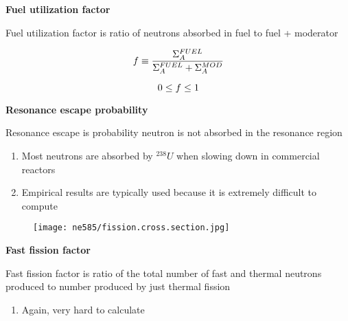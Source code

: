 \documentclass[aspectratio=1610,pdftex,dvipsnames,compress,xcolor={dvipsnames}]{beamer}
\begin{document}
\begin{frame}[plain]{}
    \centering\LARGE\textbf{Fuel utilization factor}
\end{frame}


\addtocounter{framenumber}{-1} 
\begin{frame}{Fuel utilization factor is ratio of neutrons absorbed in fuel to fuel + moderator}

    \begin{equation}
        \LARGE
        f \equiv \frac{\Sigma^{FUEL}_A}{\Sigma^{FUEL}_A + \Sigma^{MOD}_A}
    \end{equation}

    \begin{equation}
        \LARGE
        0 \leq f \leq 1
    \end{equation}

\end{frame}


\begin{frame}[plain]{}
    \centering\LARGE\textbf{Resonance escape probability}
\end{frame}


\addtocounter{framenumber}{-1} 
\begin{frame}{Resonance escape is probability neutron is not absorbed in the resonance region}
    \begin{enumerate}[series=outerlist,topsep=0pt,itemsep=21pt,leftmargin=*,label=(\arabic*)]
        \item[]Most neutrons are absorbed by $^{238}U$ when slowing down in commercial reactors
        \item[]Empirical results are typically used because it is extremely difficult to compute
    \end{enumerate}
\end{frame}


\begin{frame}{}
    \begin{figure}
        \centering
        \texttt{[image: ne585/fission.cross.section.jpg]}
    \end{figure}
\end{frame}


\begin{frame}[plain]{}
    \centering\LARGE\textbf{Fast fission factor}
\end{frame}


\addtocounter{framenumber}{-1} 
\begin{frame}{Fast fission factor is ratio of the total number of fast and thermal neutrons produced to number produced by just thermal fission}
    \begin{enumerate}[series=outerlist,topsep=0pt,itemsep=21pt,leftmargin=*,label=(\arabic*)]
        \item[]Again, very hard to calculate
    \end{enumerate}
\end{frame}
\end{document}
